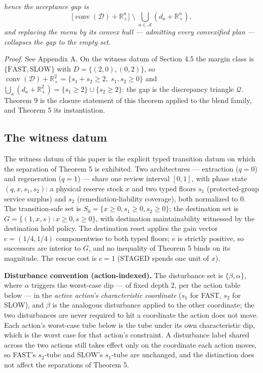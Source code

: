 \documentclass[3p,11pt]{elsarticle}
\begin{document}
\emph{hence the acceptance gap is}
\[
\bigl[\operatorname{conv}(\mathcal{D}) + \mathbb{R}^n_+\bigr]
\;\setminus\;
\bigcup_{a \in \mathcal{A}} (d_a + \mathbb{R}^n_+),
\]
\emph{and replacing the menu by its convex hull --- admitting every
convexified plan --- collapses the gap to the empty set.}

\emph{Proof.} See Appendix A. On the witness datum of Section 4.5 the margin class is
\(\{\mathrm{FAST}, \mathrm{SLOW}\}\) with \(D = \{(2,0), (0,2)\}\), so
\(\operatorname{conv}(\mathcal{D}) + \mathbb{R}^2_+ = \{ s_1 + s_2 \ge 2,\; s_1,
s_2 \ge 0\}\) and
\(\bigcup_a (d_a + \mathbb{R}^2_+) = \{ s_1 \ge 2 \} \cup \{ s_2 \ge 2
\}\): the gap is the discrepancy triangle \(\mathcal{Q}\). Theorem 9 is
the closure statement of this theorem applied to the blend family, and
Theorem 5 its instantiation.

\subsection{The witness datum}\label{the-witness-datum}

The witness datum of this paper is the explicit typed transition datum
on which the separation of Theorem 5 is exhibited. Two architectures ---
extraction (\(q = 0\)) and regeneration (\(q = 1\)) --- share one review
interval \([0,1]\), with phase state \((q, x, s_1, s_2)\): a physical
reserve stock \(x\) and two typed floors \(s_1\) (protected-group
service surplus) and \(s_2\) (remediation-liability coverage), both
normalized to \(0\). The transition-safe set is
\(S_0 = \{ x \ge 0, s_1 \ge 0, s_2 \ge 0 \}\); the destination set is
\(G = \{ (1, x, s) : x \ge 0, s \ge 0 \}\), with destination
maintainability witnessed by the destination hold policy. The destination reset applies the gain vector \(e = (1/4, 1/4)\)
componentwise to both typed floors; \(e\) is strictly positive, so successors are interior to \(G\), and no inequality of Theorem 5 binds on its magnitude. The rescue cost is \(c = 1\) (STAGED spends one
unit of \(x\)).

\textbf{Disturbance convention (action-indexed).} The disturbance set is
\(\{\beta, \alpha\}\), where \(\alpha\) triggers the worst-case dip ---
of fixed depth 2, per the action table below --- in the \emph{active
action's characteristic coordinate} (\(s_1\) for FAST, \(s_2\) for
SLOW), and \(\beta\) is the analogous disturbance applied to the other
coordinate; the two disturbances are never required to hit a coordinate
the action does not move. Each action's worst-case tube below is the
tube under its own characteristic dip, which is the worst case for that
action's constraint. A disturbance label shared across the two actions
still takes effect only on the coordinate each action moves, so FAST's
\(s_2\)-tube and SLOW's \(s_1\)-tube are unchanged, and the distinction
does not affect the separations of Theorem 5.
\end{document}
